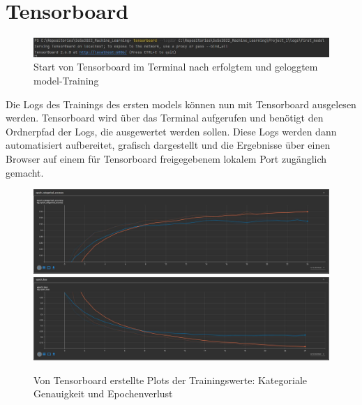 \documentclass[letterpaper,10pt]{article}
\begin{document}
\newpage


\section{Tensorboard}
    \begin{figure} [t]
        \centering
        \includegraphics[width=\textwidth]{tensorboard_terminal.JPG}
        \caption{Start von Tensorboard im Terminal nach erfolgtem und geloggtem model-Training}
    \end{figure}
    Die Logs des Trainings des ersten models können nun mit Tensorboard ausgelesen werden. Tensorboard wird über das Terminal aufgerufen und benötigt den Ordnerpfad der Logs, die ausgewertet werden sollen. Diese Logs werden dann automatisiert aufbereitet, grafisch dargestellt und die Ergebnisse über einen Browser auf einem für Tensorboard freigegebenem lokalem Port zugänglich gemacht.
    \begin{figure} [h]
        \centering
        \includegraphics[width=\textwidth]{tensorboard_catAcc.JPG}
        \includegraphics[width=\textwidth]{tensorboard_epocloss.JPG}       
        \caption{Von Tensorboard erstellte Plots der Trainingswerte: Kategoriale Genauigkeit und Epochenverlust}
    \end{figure}

\newpage
\end{document}
